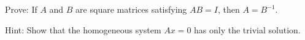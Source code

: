 
\begin{Exercise}[
name={},
title={}, 
difficulty=0,
origin={\cite{YL}}]
Prove: If $A$ and $B$ are square matrices satisfying $AB=I$, then $A=B^{-1}$.
\end{Exercise}

\begin{Answer}
Hint: Show that the homogeneous system $Ax=0$ has only the trivial solution.
\end{Answer}
